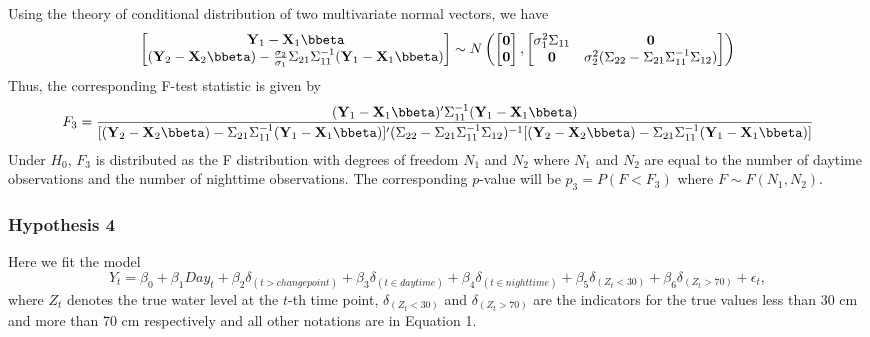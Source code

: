 \documentclass[]{article}
\begin{document}
Using the theory of conditional distribution of two multivariate normal vectors, we have
\[
\begin{bmatrix}
    \mathbf{Y}_1 - \mathbf{X}_1 \bbeta \\
    (\mathbf{Y}_2 - \mathbf{X}_2\bbeta) - \frac{\sigma_2}{\sigma_1} \Sigma_{21} \Sigma_{11}^{-1} (\mathbf{Y}_1 - \mathbf{X}_1 \bbeta)
\end{bmatrix}
\sim N \left(
\begin{bmatrix}
    \mathbf{0} \\
    \mathbf{0}
\end{bmatrix}
, 
\begin{bmatrix}
    \sigma_1^2 \Sigma_{11} & \mathbf{0} \\
    \mathbf{0} & \sigma_2^2 (\Sigma_{22} - \Sigma_{21}\Sigma_{11}^{-1}\Sigma_{12})
\end{bmatrix}
 \right)
\]
Thus, the corresponding F-test statistic is given by
\[F_3 = \frac{(\mathbf{Y}_1 - \mathbf{X}_1 \bbeta)' \Sigma_{11}^{-1} (\mathbf{Y}_1 - \mathbf{X}_1 \bbeta)}{[(\mathbf{Y}_2 - \mathbf{X}_2\bbeta) -  \Sigma_{21} \Sigma_{11}^{-1} (\mathbf{Y}_1 - \mathbf{X}_1 \bbeta)]' (\Sigma_{22} - \Sigma_{21}\Sigma_{11}^{-1}\Sigma_{12})^{-1} [(\mathbf{Y}_2 - \mathbf{X}_2\bbeta) -  \Sigma_{21} \Sigma_{11}^{-1} (\mathbf{Y}_1 - \mathbf{X}_1 \bbeta)]}\]
Under \(H_0\), \(F_3\) is distributed as the F distribution with degrees of freedom \(N_1\) and \(N_2\) where \(N_1\) and \(N_2\) are equal to the number of daytime observations and the number of nighttime observations. The corresponding \(p\)-value will be \(p_{3} = P(F < F_3)\) where \(F \sim F(N_1, N_2)\).

\subsubsection{Hypothesis 4}

Here we fit the model
\begin{equation}\label{e:OLS}
  Y_t = \beta_0 + \beta_1 Day_t + \beta_2 \delta_{(t > changepoint)} + \beta_3 \delta_{(t \in daytime)} + \beta_4 \delta_{(t \in nighttime)} + \beta_5 \delta_{(Z_t <30)} + \beta_6 \delta_{(Z_t > 70)} + \epsilon_t,
\end{equation}
where \(Z_t\) denotes the true water level at the \(t\)-th time point, \(\delta_{(Z_t <30)}\) and \(\delta_{(Z_t > 70)}\) are the indicators for the true values less than 30 cm and more than 70 cm respectively and all other notations are in Equation 1.
\end{document}
